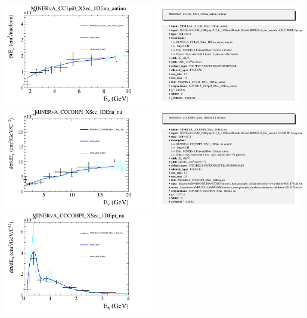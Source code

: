 \documentclass{article}
\begin{document}
\centering
\includegraphics[width=0.49\textwidth]{figures/nuisance_MINERvA_CC1pi0_XSec_1DEnu_antinu_comp.png}
\includegraphics[width=0.49\textwidth]{figures/nuisance_MINERvA_CC1pi0_XSec_1DEnu_antinu_info.png}
\centering
\includegraphics[width=0.49\textwidth]{figures/nuisance_MINERvA_CCCOHPI_XSec_1DEnu_nu_comp.png}
\includegraphics[width=0.49\textwidth]{figures/nuisance_MINERvA_CCCOHPI_XSec_1DEnu_nu_info.png}
\centering
\includegraphics[width=0.49\textwidth]{figures/nuisance_MINERvA_CCCOHPI_XSec_1DEpi_nu_comp.png}
\end{document}
